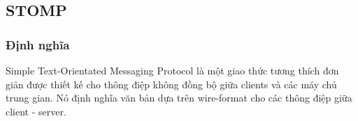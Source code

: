 \subsection{STOMP}
\subsubsection{Định nghĩa}
Simple Text-Orientated Messaging Protocol là một giao thức tương thích đơn giản được thiết kế cho thông điệp không đồng bộ giữa clients và các máy chủ trung gian. Nó định nghĩa văn bản dựa trên wire-format cho các thông điệp giữa client - server.
